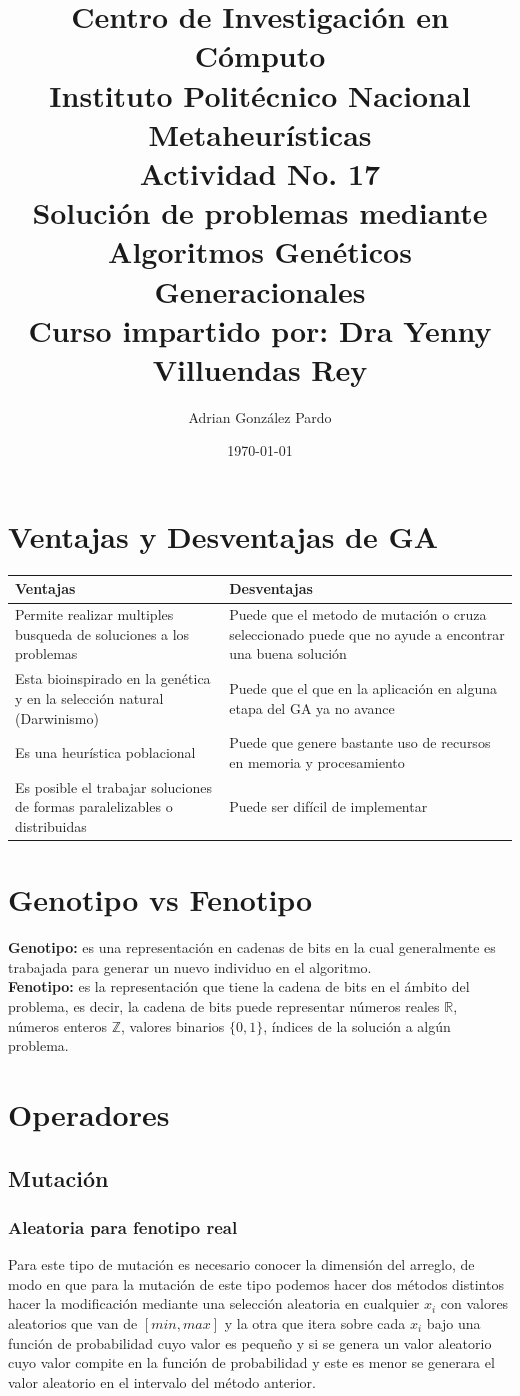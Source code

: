 \documentclass[10pt]{article}
\title{Centro de Investigación en Cómputo\\Instituto Politécnico Nacional\\Metaheurísticas\\Actividad No. 17\\Solución de problemas mediante Algoritmos Genéticos Generacionales\\Curso impartido por: Dra Yenny Villuendas Rey}
\author{Adrian González Pardo}
\date{\today}
\begin{document}
\maketitle
\section{Ventajas y Desventajas de GA}
\begin{center}
  \begin{tabular}{|p{6cm}|p{6cm}|}
    \hline
    Ventajas & Desventajas \\
    \hline
    Permite realizar multiples busqueda de soluciones a los problemas & Puede que el metodo de mutación o cruza seleccionado puede que no ayude a encontrar una buena solución\\
    \hline
    Esta bioinspirado en la genética y en la selección natural (Darwinismo) & Puede que el que en la aplicación en alguna etapa del GA ya no avance \\
    \hline
    Es una heurística poblacional & Puede que genere bastante uso de recursos en memoria y procesamiento \\
    \hline
    Es posible el trabajar soluciones de formas paralelizables o distribuidas&Puede ser difícil de implementar\\
    \hline
  \end{tabular}
\end{center}
\section{Genotipo vs Fenotipo}
\textbf{Genotipo:} es una representación en cadenas de bits en la cual generalmente es trabajada para generar un nuevo individuo en el algoritmo.
\\
\textbf{Fenotipo:} es la representación que tiene la cadena de bits en el ámbito del problema, es decir, la cadena de bits puede representar números reales $\mathbb{R}$, números enteros $\mathbb{Z}$, valores binarios $\{0,1\}$, índices de la solución a algún problema.

\section{Operadores}
\subsection{Mutación}
\subsubsection{Aleatoria para fenotipo real}
Para este tipo de mutación es necesario conocer la dimensión del arreglo, de modo en que para la mutación de este tipo podemos hacer dos métodos distintos hacer la modificación mediante una selección aleatoria en cualquier $x_{i}$ con valores aleatorios que van de $[min,max]$ y la otra que itera sobre cada $x_{i}$ bajo una función de probabilidad cuyo valor es pequeño y si se genera un valor aleatorio cuyo valor compite en la función de probabilidad y este es menor se generara el valor aleatorio en el intervalo del método anterior.
\end{document}
